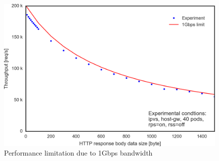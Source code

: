 \begin{figure}
\includegraphics[width=\columnwidth]{Figs/performance_limitation}
\caption{Performance limitation due to 1Gbps bandwidth}
\label{fig:performance_limitation}
\end{figure}

